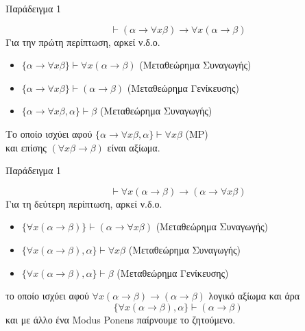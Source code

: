 \documentclass{beamer}
\begin{document}
\begin{frame}{Παράδειγμα 1}
  \begin{block}{}
    \[
      \vdash (\alpha \rightarrow \forall x \beta) \rightarrow \forall x (\alpha \rightarrow \beta)
    \]
    Για την πρώτη περίπτωση, αρκεί ν.δ.ο.
    \begin{itemize}
      \item $\{\alpha \rightarrow \forall x \beta\} \vdash \forall x (\alpha \rightarrow \beta)$ (Μεταθεώρημα Συναγωγής)
      \item $\{\alpha \rightarrow \forall x \beta\} \vdash (\alpha \rightarrow \beta)$ (Μεταθεώρημα Γενίκευσης)
      \item $\{\alpha \rightarrow \forall x \beta, \alpha\} \vdash \beta$ (Μεταθεώρημα Συναγωγής)
    \end{itemize}
    Το οποίο ισχύει αφού $\{\alpha \rightarrow \forall x \beta, \alpha\} \vdash \forall x \beta$ (MP)\\
    και επίσης $(\forall x \beta \rightarrow \beta)$ είναι αξίωμα.
  \end{block}
\end{frame}

\begin{frame}{Παράδειγμα 1}
  \begin{block}{}
    \[
      \vdash \forall x (\alpha \rightarrow \beta) \rightarrow (\alpha \rightarrow \forall x \beta)
    \]
    Για τη δεύτερη περίπτωση, αρκεί ν.δ.ο.
    \begin{itemize}
      \item $\{\forall x (\alpha \rightarrow \beta)\} \vdash (\alpha \rightarrow \forall x \beta)$ (Μεταθεώρημα Συναγωγής)
      \item $\{\forall x (\alpha \rightarrow \beta), \alpha\} \vdash \forall x \beta$ (Μεταθεώρημα Συναγωγής)
      \item $\{\forall x (\alpha \rightarrow \beta), \alpha\} \vdash \beta$ (Μεταθεώρημα Γενίκευσης)
    \end{itemize}
    το οποίο ισχύει αφού $\forall x (\alpha \rightarrow \beta) \rightarrow (\alpha \rightarrow \beta)$ λογικό αξίωμα και άρα
    \[
      \{\forall x (\alpha \rightarrow \beta), \alpha\} \vdash (\alpha \rightarrow \beta)
    \]
    και με άλλο ένα Modus Ponens παίρνουμε το ζητούμενο.
  \end{block}
\end{frame}
\end{document}
